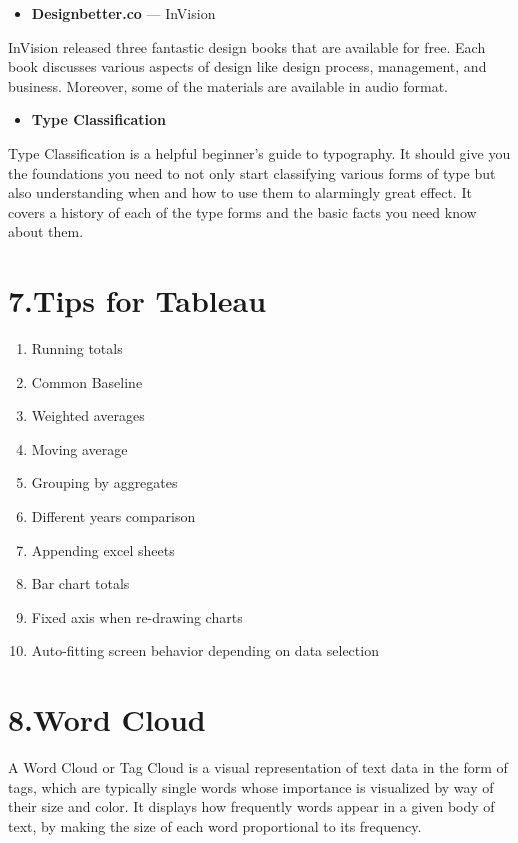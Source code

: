 \documentclass[]{book}
\providecommand{\tightlist}{%
  \setlength{\itemsep}{0pt}\setlength{\parskip}{0pt}}
\theoremstyle{definition}
\theoremstyle{definition}
\theoremstyle{definition}
\theoremstyle{remark}
\begin{document}
\begin{itemize}
\tightlist
\item
  \textbf{Designbetter.co} --- InVision
\end{itemize}

InVision released three fantastic design books that are available for
free. Each book discusses various aspects of design like design process,
management, and business. Moreover, some of the materials are available
in audio format.

\begin{itemize}
\tightlist
\item
  \textbf{Type Classification}
\end{itemize}

Type Classification is a helpful beginner's guide to typography. It
should give you the foundations you need to not only start classifying
various forms of type but also understanding when and how to use them to
alarmingly great effect. It covers a history of each of the type forms
and the basic facts you need know about them.\citep{design_ebooks}

\section{7.Tips for Tableau}\label{tips-for-tableau}

\begin{enumerate}
\def\labelenumi{\arabic{enumi}.}
\tightlist
\item
  Running totals
\item
  Common Baseline
\item
  Weighted averages
\item
  Moving average
\item
  Grouping by aggregates
\item
  Different years comparison
\item
  Appending excel sheets
\item
  Bar chart totals
\item
  Fixed axis when re-drawing charts
\item
  Auto-fitting screen behavior depending on data selection
\end{enumerate}

\section{8.Word Cloud}\label{word-cloud}

A Word Cloud or Tag Cloud is a visual representation of text data in the
form of tags, which are typically single words whose importance is
visualized by way of their size and color. It displays how frequently
words appear in a given body of text, by making the size of each word
proportional to its frequency.
\end{document}
